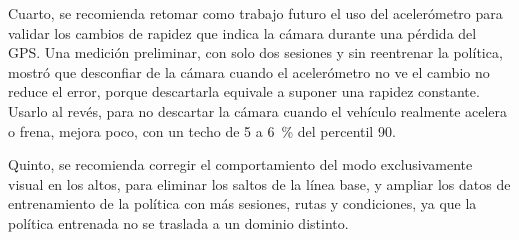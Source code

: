 Cuarto, se recomienda retomar como trabajo futuro el uso del acelerómetro para validar los cambios de rapidez que indica la cámara durante una pérdida del GPS.
Una medición preliminar, con solo dos sesiones y sin reentrenar la política, mostró que desconfiar de la cámara cuando el acelerómetro no ve el cambio no reduce el error, porque descartarla equivale a suponer una rapidez constante.
Usarlo al revés, para no descartar la cámara cuando el vehículo realmente acelera o frena, mejora poco, con un techo de 5 a 6~\% del percentil 90.

Quinto, se recomienda corregir el comportamiento del modo exclusivamente visual en los altos, para eliminar los saltos de la línea base, y ampliar los datos de entrenamiento de la política con más sesiones, rutas y condiciones, ya que la política entrenada no se traslada a un dominio distinto.

